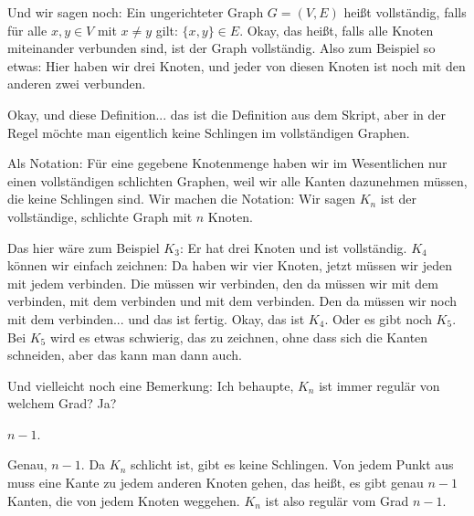 \begin{spoken-clean}[00:51:35 - 00:54:44]
Und wir sagen noch: Ein ungerichteter Graph $G = (V, E)$ heißt vollständig, falls für alle $x, y \in V$ mit $x \neq y$ gilt: $\{x, y\} \in E$. Okay, das heißt, falls alle Knoten miteinander verbunden sind, ist der Graph vollständig. Also zum Beispiel so etwas: Hier haben wir drei Knoten, und jeder von diesen Knoten ist noch mit den anderen zwei verbunden.

Okay, und diese Definition... das ist die Definition aus dem Skript, aber in der Regel möchte man eigentlich keine Schlingen im vollständigen Graphen.

Als Notation: Für eine gegebene Knotenmenge haben wir im Wesentlichen nur einen vollständigen schlichten Graphen, weil wir alle Kanten dazunehmen müssen, die keine Schlingen sind. Wir machen die Notation: Wir sagen $K_n$ ist der vollständige, schlichte Graph mit $n$ Knoten.

Das hier wäre zum Beispiel $K_3$: Er hat drei Knoten und ist vollständig. $K_4$ können wir einfach zeichnen: Da haben wir vier Knoten, jetzt müssen wir jeden mit jedem verbinden. Die müssen wir verbinden, den da müssen wir mit dem verbinden, mit dem verbinden und mit dem verbinden. Den da müssen wir noch mit dem verbinden... und das ist fertig. Okay, das ist $K_4$. Oder es gibt noch $K_5$. Bei $K_5$ wird es etwas schwierig, das zu zeichnen, ohne dass sich die Kanten schneiden, aber das kann man dann auch.

Und vielleicht noch eine Bemerkung: Ich behaupte, $K_n$ ist immer regulär von welchem Grad? Ja?
\end{spoken-clean}

\begin{student-interaction}[Studentenantwort]
$n-1$.
\end{student-interaction}

\begin{spoken-clean}[00:54:44 - 00:54:45]
Genau, $n-1$. Da $K_n$ schlicht ist, gibt es keine Schlingen. Von jedem Punkt aus muss eine Kante zu jedem anderen Knoten gehen, das heißt, es gibt genau $n-1$ Kanten, die von jedem Knoten weggehen. $K_n$ ist also regulär vom Grad $n-1$.
\end{spoken-clean}

